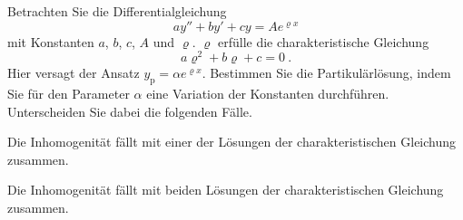 \begin{atiTask}[
  title = Der Resonanzfall
]
  Betrachten Sie die Differentialgleichung
  \[
    ay'' + by' + cy = A e^{\varrho x}
  \]
  mit Konstanten $a$, $b$, $c$, $A$ und $\varrho$.
  $\varrho$ erfülle die charakteristische Gleichung
  \[
    a\varrho^2 + b \varrho + c = 0 \ .
  \]
  Hier versagt der Ansatz $y_\text{p} = \alpha e^{\varrho x}$.
  Bestimmen Sie die Partikulärlösung, indem Sie für den Parameter $\alpha$ eine Variation der Konstanten durchführen.
  Unterscheiden Sie dabei die folgenden Fälle.
  \begin{atiSubtasks}
    \item{
      Die Inhomogenität fällt mit einer der Lösungen der charakteristischen Gleichung zusammen.
    }
    \item{
      Die Inhomogenität fällt mit beiden Lösungen der charakteristischen Gleichung zusammen.
    }
  \end{atiSubtasks}
\end{atiTask}